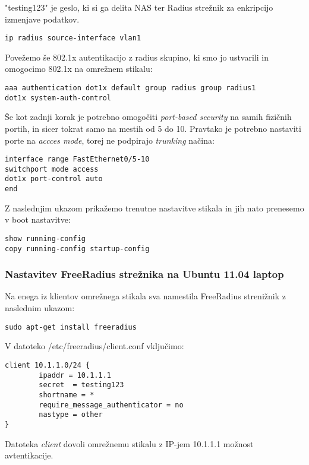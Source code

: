 \documentclass[12pt]{article}
\begin{document}
"testing123" je geslo, ki si ga delita NAS ter Radius strežnik za enkripcijo izmenjave podatkov.

\begin{verbatim}
ip radius source-interface vlan1
\end{verbatim}

Povežemo še 802.1x autentikacijo z radius skupino, ki smo jo ustvarili in omogocimo 802.1x na omrežnem stikalu:

\begin{verbatim}
aaa authentication dot1x default group radius group radius1
dot1x system-auth-control
\end{verbatim}

Še kot zadnji korak je potrebno omogočiti \emph{port-based security} na samih fizičnih portih, in sicer tokrat samo na mestih od 5 do 10. Pravtako je potrebno nastaviti porte na \emph{accces mode}, torej ne podpirajo \emph{trunking} načina:

\begin{verbatim}
interface range FastEthernet0/5-10
switchport mode access
dot1x port-control auto
end
\end{verbatim}

Z naslednjim ukazom prikažemo trenutne nastavitve stikala in jih nato prenesemo v boot nastavitve:

\begin{verbatim}
show running-config
copy running-config startup-config
\end{verbatim}

\subsubsection{Nastavitev FreeRadius strežnika na Ubuntu 11.04 laptop}

Na enega iz klientov omrežnega stikala sva namestila FreeRadius strenižnik z naslednim ukazom:

\begin{verbatim}
sudo apt-get install freeradius
\end{verbatim}

V datoteko /etc/freeradius/client.conf vključimo:

\begin{verbatim}
client 10.1.1.0/24 {
        ipaddr = 10.1.1.1
        secret  = testing123
        shortname = *
        require_message_authenticator = no
        nastype = other
}
\end{verbatim}

Datoteka \emph{client} dovoli omrežnemu stikalu z IP-jem 10.1.1.1 možnost avtentikacije.
\end{document}
